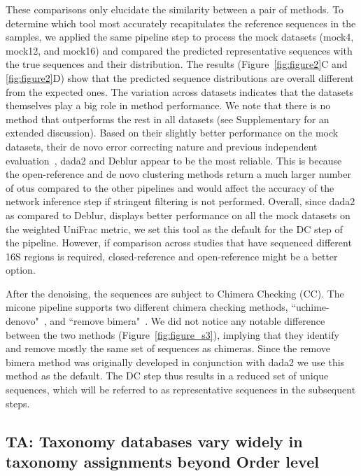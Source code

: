   These comparisons only elucidate the similarity between a pair of methods.
  To determine which tool most accurately recapitulates the reference sequences in the samples, we applied the same pipeline step to process the mock datasets (mock4, mock12, and mock16) and compared the predicted representative sequences with the true sequences and their distribution.
  The results (Figure~\ref{fig:figure2}C and \ref{fig:figure2}D) show that the predicted sequence distributions are overall different from the expected ones.
  The variation across datasets indicates that the datasets themselves play a big role in method performance.
  We note that there is no method that outperforms the rest in all datasets (see Supplementary for an extended discussion).
  Based on their slightly better performance on the mock datasets, their de novo error correcting nature and previous independent evaluation~\cite{Nearing2018}, \ac{dada2} and Deblur appear to be the most reliable.
  This is because the open-reference and de novo clustering methods return a much larger number of \ac{otu}s compared to the other pipelines and would affect the accuracy of the network inference step if stringent filtering is not performed.
  Overall, since \ac{dada2} as compared to Deblur, displays better performance on all the mock datasets on the weighted UniFrac metric, we set this tool as the default for the DC step of the pipeline.
  However, if comparison across studies that have sequenced different 16S regions is required, closed-reference and open-reference might be a better option.

  After the denoising, the sequences are subject to Chimera Checking (CC).
  The \ac{micone} pipeline supports two different chimera checking methods, ``uchime-denovo"~\cite{bolyenReproducibleInteractiveScalable2019}, and ``remove bimera"~\cite{Callahan2016}.
  We did not notice any notable difference between the two methods (Figure~\ref{fig:figure_s3}), implying that they identify and remove mostly the same set of sequences as chimeras.
  Since the remove bimera method was originally developed in conjunction with dada2 we use this method as the default.
  The DC step thus results in a reduced set of unique sequences, which will be referred to as representative sequences in the subsequent steps.

  \FloatBarrier

  \subsection*{TA: Taxonomy databases vary widely in taxonomy assignments beyond Order level}

